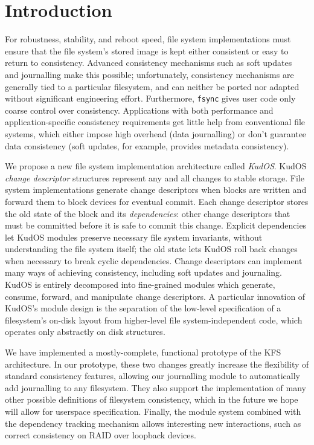 
\section*{Introduction}
\label{sec:intro}

For robustness, stability, and reboot speed, file system implementations
must ensure that the file system's stored image is kept either consistent
or easy to return to consistency.
%
Advanced consistency mechanisms such as soft updates~\cite{ganger00soft}
and journalling make this possible; unfortunately,
%
%
consistency mechanisms are generally tied to a particular filesystem, and
can neither be ported nor adapted without significant engineering
effort.
%
Furthermore, \verb+fsync+ gives user code only coarse control over
consistency.
%
Applications with both performance and application-specific consistency
requirements get little help from conventional file systems, which either
impose high overhead (data journalling) or don't guarantee data consistency
(soft updates, for example, provides metadata consistency).



We propose a new file system implementation architecture called
\emph{KudOS}.
%
KudOS \emph{change descriptor} structures represent any and all changes to
stable storage.
%
File system implementations generate change descriptors when blocks are
written and forward them to block devices for eventual commit.
%
Each change descriptor stores the old state of the block and its
\emph{dependencies}: other change descriptors that must be committed before
it is safe to commit this change.
%
Explicit dependencies let KudOS modules preserve necessary file system
invariants, without understanding the file system itself; the old state
lets KudOS roll back changes when necessary to break cyclic dependencies.
%
Change descriptors can implement many ways of achieving
consistency, including soft updates and journaling.
%
%
%
KudOS is entirely decomposed into fine-grained modules which generate,
consume, forward, and manipulate change descriptors.
%
A particular innovation of KudOS's module design is the separation of the
low-level specification of a filesystem's on-disk layout from higher-level
file system-independent code, which operates only abstractly on disk
structures.

We have implemented a mostly-complete, functional prototype of the KFS
architecture. In our prototype, these two changes greatly increase the
flexibility of standard consistency features, allowing our journalling
module to automatically add journalling to any filesystem. They also support
the implementation of many other possible definitions of filesystem
consistency, which in the future we hope will allow for userspace
specification. Finally, the module system combined with the dependency
tracking mechanism allows interesting new interactions, such as correct
consistency on RAID over loopback devices.
